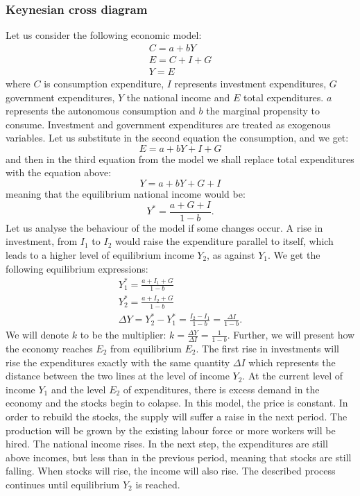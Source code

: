 \documentclass[a4paper,11pt]{report}
\begin{document}
\subsubsection{Keynesian cross diagram}
Let us consider the following economic model:
\begin{align*}
 C=a+bY\\
 E=C+I+G\\
 Y=E
\end{align*}
where $C$ is consumption expenditure, $I$ represents investment expenditures, $G$ government expenditures, $Y$ the national income and $E$ total expenditures. $a$ represents the autonomous consumption and $b$ the marginal propensity to consume.
Investment and government expenditures are treated as exogenous variables. Let us substitute in the second equation the consumption, and we get:
\begin{equation*}
 E=a+bY+I+G
\end{equation*}
and then in the third equation from the model we shall replace total expenditures with the equation above:
\begin{equation*}
 Y=a+bY+G+I
\end{equation*}
meaning that the equilibrium national income would be:
\begin{equation}
 Y^{*}=\frac{a+G+I}{1-b}.
\end{equation}
Let us analyse the behaviour of the model if some changes occur. A rise in investment, from $I_{1}$ to $I_{2}$ would raise the expenditure parallel to itself, which leads to a higher level of equilibrium income $Y_{2}$, as against $Y_{1}$. We get the following equilibrium expressions:
\begin{align*}
 Y_{1}^{*}=\frac{a+I_{1}+G}{1-b}\\
Y_{2}^{*}=\frac{a+I_{2}+G}{1-b}\\
\Delta Y=Y^{*}_{2}-Y^{*}_{1}=\frac{I_{2}-I_{1}}{1-b}=\frac{\Delta I}{1-b}.
 \end{align*}
We will denote $k$ to be the multiplier: $k=\frac{\Delta Y}{\Delta I}=\frac{1}{1-b}$. Further, we will present how the economy reaches $E_{2}$ from equilibrium $E_{2}$. The first rise in investments will rise the expenditures exactly with the same quantity $\Delta I$ which represents the distance between the two lines at the level of income $Y_{2}$. At the current level of income $Y_{1}$ and the level $E_{2}$ of expenditures, there is excess demand in the economy and the stocks begin to colapse. In this model, the price is constant. In order to rebuild the stocks, the supply will suffer a raise in the next period. The production will be grown by the existing labour force or more workers will be hired. The national income rises. In the next step, the expenditures are still above incomes, but less than in the previous period, meaning that stocks are still falling. When stocks will rise, the income will also rise. The described process continues until equilibrium $Y_{2}$ is reached.
\end{document}
